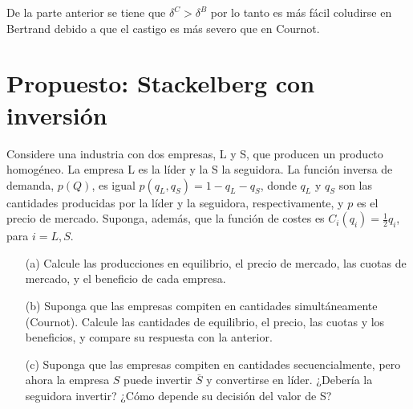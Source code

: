 \documentclass{exam}
\begin{document}
\begin{enumerate}
    \begin{solution}
    De la parte anterior se tiene que $\delta^{C}>\delta^{B}$ por lo tanto es más fácil coludirse en Bertrand debido a que el castigo es más severo que en Cournot.
    \end{solution}
\end{enumerate}

\section{Propuesto: Stackelberg con inversión}

Considere una industria con dos empresas, L y S, que producen un producto homogéneo. 
La empresa L es la líder y la S la seguidora. La función inversa de demanda, \( p(Q) \), 
es igual \( p(q_L, q_S) = 1 - q_L - q_S \), donde \( q_L \) y \( q_S \) son las cantidades 
producidas por la líder y la seguidora, respectivamente, y \( p \) es el precio de mercado. 
Suponga, además, que la función de costes es \( C_i(q_i) = \frac{1}{2} q_i \), para \( i = L, S \).

\begin{enumerate}
    \item[(a)] Calcule las producciones en equilibrio, el precio de mercado, las cuotas de mercado, y el beneficio de cada empresa.
    \item[(b)] Suponga que las empresas compiten en cantidades simultáneamente (Cournot). 
    Calcule las cantidades de equilibrio, el precio, las cuotas y los beneficios, y compare su respuesta con la anterior.
    \item[(c)] Suponga que las empresas compiten en cantidades secuencialmente, 
    pero ahora la empresa \( S \) puede invertir \( \bar{S} \) y convertirse en líder. 
    ¿Debería la seguidora invertir? ¿Cómo depende su decisión del valor de S?
\end{enumerate}
\end{document}
